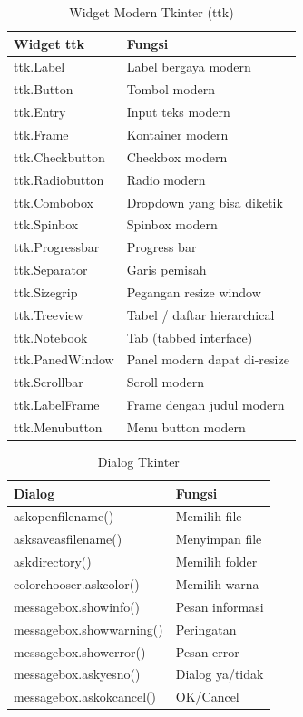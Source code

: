 \begin{table}[H]
  \centering
  \caption{Widget Modern Tkinter (ttk)}
  \label{tab:b11-ttk}
  \begin{tabularx}{\textwidth}{lX}
    \hline
    \textbf{Widget ttk} & \textbf{Fungsi} \\
    \hline
    ttk.Label & Label bergaya modern \\
    \hline
    ttk.Button & Tombol modern \\
    \hline
    ttk.Entry & Input teks modern \\
    \hline
    ttk.Frame & Kontainer modern \\
    \hline
    ttk.Checkbutton & Checkbox modern \\
    \hline
    ttk.Radiobutton & Radio modern \\
    \hline
    ttk.Combobox & Dropdown yang bisa diketik \\
    \hline
    ttk.Spinbox & Spinbox modern \\
    \hline
    ttk.Progressbar & Progress bar \\
    \hline
    ttk.Separator & Garis pemisah \\
    \hline
    ttk.Sizegrip & Pegangan resize window \\
    \hline
    ttk.Treeview & Tabel / daftar hierarchical \\
    \hline
    ttk.Notebook & Tab (tabbed interface) \\
    \hline
    ttk.PanedWindow & Panel modern dapat di-resize \\
    \hline
    ttk.Scrollbar & Scroll modern \\
    \hline
    ttk.LabelFrame & Frame dengan judul modern \\
    \hline
    ttk.Menubutton & Menu button modern \\
    \hline
  \end{tabularx}
\end{table}

\begin{table}[H]
  \centering
  \caption{Dialog Tkinter}
  \label{tab:b11-dialog}
  \begin{tabularx}{\textwidth}{lX}
    \hline
    \textbf{Dialog} & \textbf{Fungsi} \\
    \hline
    askopenfilename() & Memilih file \\
    \hline
    asksaveasfilename() & Menyimpan file \\
    \hline
    askdirectory() & Memilih folder \\
    \hline
    colorchooser.askcolor() & Memilih warna \\
    \hline
    messagebox.showinfo() & Pesan informasi \\
    \hline
    messagebox.showwarning() & Peringatan \\
    \hline
    messagebox.showerror() & Pesan error \\
    \hline
    messagebox.askyesno() & Dialog ya/tidak \\
    \hline
    messagebox.askokcancel() & OK/Cancel \\
    \hline
  \end{tabularx}
\end{table}


